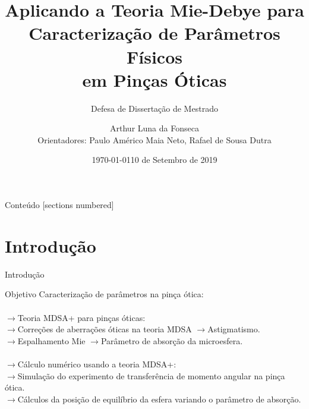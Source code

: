 \documentclass[10pt]{beamer}
\title{Aplicando a Teoria Mie-Debye para Caracterização de Parâmetros Físicos \\em Pinças Óticas}
\subtitle{Defesa de Dissertação de Mestrado}
\date{\today}
\author{Arthur Luna da Fonseca \\Orientadores: Paulo Américo Maia Neto, Rafael de Sousa Dutra}
\date{10 de Setembro de 2019}
\institute{Instituto de Física - Universidade Federal do Rio de Janeiro}
\begin{document}
\maketitle


\begin{frame}{Conteúdo}
  [sections numbered]
  \tableofcontents[hideallsubsections]
\end{frame}


\section{Introdução}


\begin{frame}[fragile]{Introdução}
      \begin{center}
          \begin{exampleblock}{Objetivo}
            Caracterização de parâmetros na pinça ótica:\\
            \hspace{1mm}\\
            \hspace{4mm}$\rightarrow$Teoria MDSA+ para pinças óticas:\\
            \hspace{7mm}$\rightarrow$Correções de aberrações óticas na teoria MDSA $\rightarrow$Astigmatismo.\\
            \hspace{7mm}$\rightarrow$Espalhamento Mie $\rightarrow$Parâmetro de absorção da microesfera.\\
            \hspace{1mm}\\
            \hspace{4mm}$\rightarrow$Cálculo numérico usando a teoria MDSA+:\\
            \hspace{7mm}$\rightarrow$Simulação do experimento de transferência de momento angular na pinça ótica.\\
            \hspace{7mm}$\rightarrow$Cálculos da posição de equilíbrio da esfera variando o parâmetro de absorção.
          \end{exampleblock}
      \end{center}
\end{frame}
\end{document}
